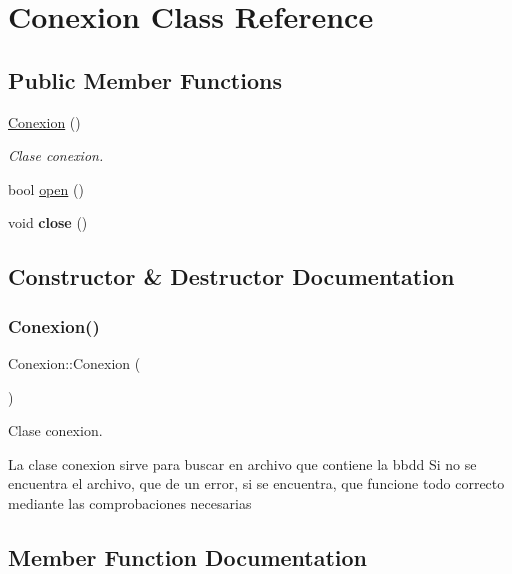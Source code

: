 \hypertarget{classConexion}{}\section{Conexion Class Reference}
\label{classConexion}
\subsection*{Public Member Functions}
\begin{DoxyCompactItemize}
\item 
\mbox{\hyperlink{classConexion_aba0281e06667725e147fa891e8a82fb3}{Conexion}} ()
\begin{DoxyCompactList}\small\item\em Clase conexion. \end{DoxyCompactList}\item 
bool \mbox{\hyperlink{classConexion_af697de4217c41446258b49844b4d85c1}{open}} ()
\item 
\mbox{\label{classConexion_ac83336bc48ea39ae47c2e8b0b10fba64}} 
void {\bfseries close} ()
\end{DoxyCompactItemize}


\subsection{Constructor \& Destructor Documentation}
\mbox{\label{classConexion_aba0281e06667725e147fa891e8a82fb3}} 
\subsubsection{\texorpdfstring{Conexion()}{Conexion()}}
{\footnotesize\ttfamily Conexion\+::\+Conexion (\begin{DoxyParamCaption}{ }\end{DoxyParamCaption})}



Clase conexion. 

La clase conexion sirve para buscar en archivo que contiene la bbdd Si no se encuentra el archivo, que de un error, si se encuentra, que funcione todo correcto mediante las comprobaciones necesarias 

\subsection{Member Function Documentation}
\mbox{\label{classConexion_af697de4217c41446258b49844b4d85c1}} 
